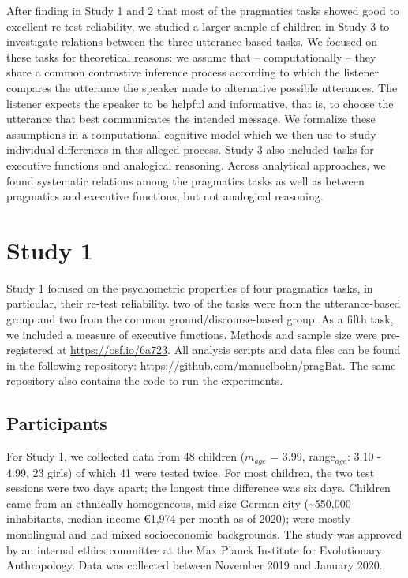 \documentclass[
  man,floatsintext]{apa6}
\begin{document}
After finding in Study 1 and 2 that most of the pragmatics tasks showed good to excellent re-test reliability, we studied a larger sample of children in Study 3 to investigate relations between the three utterance-based tasks. We focused on these tasks for theoretical reasons: we assume that -- computationally -- they share a common contrastive inference process according to which the listener compares the utterance the speaker made to alternative possible utterances. The listener expects the speaker to be helpful and informative, that is, to choose the utterance that best communicates the intended message. We formalize these assumptions in a computational cognitive model which we then use to study individual differences in this alleged process. Study 3 also included tasks for executive functions and analogical reasoning. Across analytical approaches, we found systematic relations among the pragmatics tasks as well as between pragmatics and executive functions, but not analogical reasoning.

\hypertarget{study-1}{%
\section{Study 1}\label{study-1}}

Study 1 focused on the psychometric properties of four pragmatics tasks, in particular, their re-test reliability. two of the tasks were from the utterance-based group and two from the common ground/discourse-based group. As a fifth task, we included a measure of executive functions. Methods and sample size were pre-registered at \url{https://osf.io/6a723}. All analysis scripts and data files can be found in the following repository: \url{https://github.com/manuelbohn/pragBat}. The same repository also contains the code to run the experiments.

\hypertarget{participants}{%
\subsection{Participants}\label{participants}}

For Study 1, we collected data from 48 children (\(m_{age}\) = 3.99, range\(_{age}\): 3.10 - 4.99, 23 girls) of which 41 were tested twice. For most children, the two test sessions were two days apart; the longest time difference was six days. Children came from an ethnically homogeneous, mid-size German city (\textasciitilde550,000 inhabitants, median income €1,974 per month as of 2020); were mostly monolingual and had mixed socioeconomic backgrounds. The study was approved by an internal ethics committee at the Max Planck Institute for Evolutionary Anthropology. Data was collected between November 2019 and January 2020.
\end{document}
